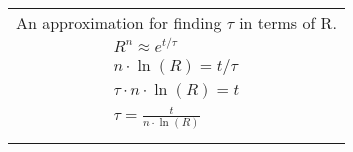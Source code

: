 \begin{tabular}{@{}L@{}}
An approximation for finding $\tau$ in terms of R.
\begin{align*}
R^n \approx e^{t/\tau}  \\
n \cdot \ln(R) = t/\tau \\
\tau \cdot n \cdot \ln(R) = t \\
\tau = \frac{t}{n \cdot \ln(R)} \\
\end{align*}
\end{tabular}
